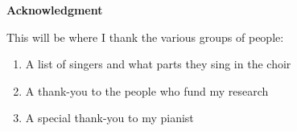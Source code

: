 \cleardoublepage
\newpage
\thispagestyle{empty}
{}

\begin{center}\huge \textbf{Acknowledgment}\end{center}


This will be where I thank the various groups of people:

\begin{enumerate}
    \item A list of singers and what parts they sing in the choir
    \item A thank-you to the people who fund my research
    \item A special thank-you to my pianist
\end{enumerate}